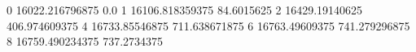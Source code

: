 0 16022.216796875 0.0
1 16106.818359375 84.6015625
2 16429.19140625 406.974609375
4 16733.85546875 711.638671875
6 16763.49609375 741.279296875
8 16759.490234375 737.2734375
